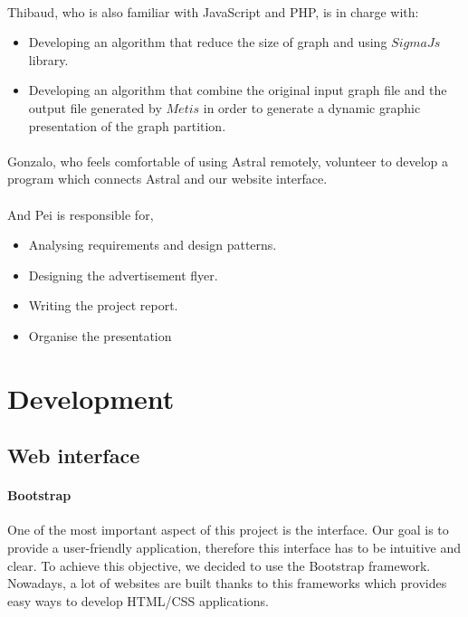 \documentclass{cranfieldChart}
\begin{document}
\paragraph{}
Thibaud, who is also familiar with JavaScript and PHP, is in charge with: 
\begin{itemize}
    \item Developing an algorithm that reduce the size of graph and using $SigmaJs$ library.
    \item Developing an algorithm that combine the original input graph file and the output file generated by $Metis$ in order to generate a dynamic graphic presentation of the graph partition. 
\end{itemize}

\paragraph{}
Gonzalo, who feels comfortable of using Astral remotely, volunteer to develop a program which connects Astral and our website interface.

\paragraph{}
And Pei is responsible for, 
\begin{itemize}
    \item Analysing requirements and design patterns. 
    \item Designing the advertisement flyer.
    \item Writing  the project report.
    \item Organise the presentation 
\end{itemize}

\section{Development}

\subsection{Web interface}

\paragraph{Bootstrap}
One of the most important aspect of this project is the interface. Our goal is to provide a user-friendly application, therefore this interface has to be intuitive and clear. To achieve this objective, we decided to use the Bootstrap framework. Nowadays, a lot of websites are built thanks to this frameworks which provides easy ways to develop HTML/CSS applications.
\end{document}
